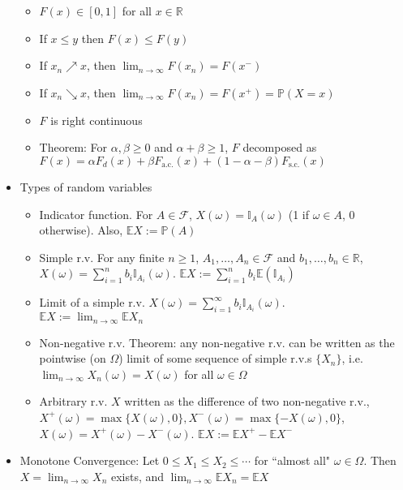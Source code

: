 \begin{itemize}
    \begin{itemize}
        \item $F(x) \in [0,1]$ for all $x \in \mathbb{R}$
        \item If $x \leq y$ then $F(x) \leq F(y)$
        \item If $x_n \nearrow x$, then $\lim_{n\to\infty} F(x_n) = F(x^-)$
        \item If $x_n \searrow x$, then $\lim_{n\to\infty} F(x_n) = F(x^+) = \mathbb{P}(X = x)$
        \item $F$ is right continuous
        \item Theorem: For $\alpha,\beta \geq 0$ and $\alpha+\beta \geq 1$, $F$ decomposed as \\ $F(x) = \alpha F_d(x) + \beta F_{\text{a.c.}}(x) + (1-\alpha-\beta)F_{\text{s.c.}}(x)$
    \end{itemize}
    \item Types of random variables
    \begin{itemize}
        \item Indicator function. For $A \in \mathcal{F}$, $X(\omega) = \mathbb{I}_A(\omega)$ (1 if $\omega\in A$, 0 otherwise). Also, $\mathbb{E}X := \mathbb{P}(A)$
        \item Simple r.v. For any finite $n \geq 1$, $A_1, \dots, A_n \in \mathcal{F}$ and $b_1, \dots, b_n \in \mathbb{R}$, $X(\omega) = \sum_{i=1}^n b_i \mathbb{I}_{A_i}(\omega)$. $\mathbb{E}X := \sum_{i=1}^n b_i \mathbb{E}(\mathbb{I}_{A_i})$
        \item Limit of a simple r.v. $X(\omega) = \sum_{i=1}^\infty b_i \mathbb{I}_{A_i}(\omega)$. \\ $\displaystyle\mathbb{E}X := \lim_{n\to\infty} \mathbb{E}X_n$
        \item Non-negative r.v. Theorem: any non-negative r.v. can be written as the pointwise (on $\Omega$) limit of some sequence of simple r.v.s $\{X_n\}$, i.e. $\displaystyle\lim_{n\to\infty} X_n(\omega) = X(\omega)$ for all $\omega\in\Omega$
        \item Arbitrary r.v. $X$ written as the difference of two non-negative r.v., $X^+(\omega) = \max\{X(\omega), 0\}, X^-(\omega) = \max\{-X(\omega), 0\}$, \\ $X(\omega) = X^+(\omega) - X^-(\omega)$. $\mathbb{E}X := \mathbb{E}X^+ - \mathbb{E}X^-$
    \end{itemize}
    \item Monotone Convergence: Let $0 \leq X_1 \leq X_2 \leq \cdots$ for ``almost all" $\omega\in\Omega$. Then $\displaystyle X = \lim_{n\to\infty}X_n$ exists, and $\displaystyle\lim_{n\to\infty} \mathbb{E}X_n = \mathbb{E}X$

\end{itemize}
